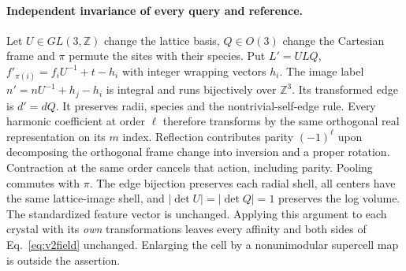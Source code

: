\paragraph{Independent invariance of every query and reference.}
Let $U\in GL(3,\mathbb Z)$ change the lattice basis, $Q\in O(3)$ change the Cartesian
frame and $\pi$ permute the sites with their species. Put
$L'=ULQ$, $f'_{\pi(i)}=f_iU^{-1}+t-h_i$ with integer wrapping vectors $h_i$.
The image label $n'=nU^{-1}+h_j-h_i$ is integral and runs bijectively over
$\mathbb Z^3$. Its transformed edge is $d'=dQ$. It preserves radii, species and
the nontrivial-self-edge rule. Every harmonic coefficient at order $\ell$ therefore
transforms by the same orthogonal real representation on its $m$ index. Reflection
contributes parity $(-1)^\ell$ upon decomposing the orthogonal frame change into inversion
and a proper rotation. Contraction at the same order cancels that action, including parity.
Pooling commutes with $\pi$. The edge bijection preserves each radial shell, all centers
have the same lattice-image shell, and $|\det U|=|\det Q|=1$ preserves the log volume.
The standardized feature vector is unchanged. Applying this argument to each crystal
with its \emph{own} transformations leaves every affinity and both sides of
Eq.~\eqref{eq:v2field} unchanged. Enlarging the cell by a nonunimodular supercell map
is outside the assertion.

